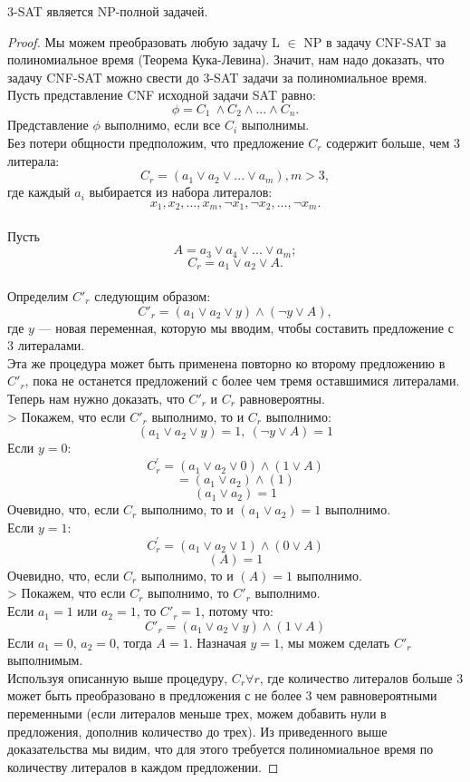     \begin{Thm}
        3-SAT является NP-полной задачей.
    \end{Thm}
    \begin{proof}
        Мы можем преобразовать любую задачу L $\in$ NP в задачу CNF-SAT за полиномиальное время (Теорема Кука-Левина). Значит, нам надо доказать, что задачу CNF-SAT можно свести до 3-SAT задачи за полиномиальное время.\\
        Пусть представление CNF исходной задачи SAT равно:
        $$\phi = C_1 \ \wedge C_2 \wedge ... \wedge C_n.$$ Представление $\phi$ выполнимо, если все $C_i$ выполнимы.\\
        Без потери общности предположим, что предложение $C_r$ содержит больше, чем 3 литерала:
        $$C_r = (a_1 \vee a_2 \vee ... \vee a_m), m>3,$$ где каждый $a_i$ выбирается из набора литералов:  $$x_1, x_2, ...,x_m, \neg x_1, \neg x_2, ..., \neg x_m.$$\\
        Пусть $$A = a_3 \vee a_4 \vee ... \vee a_m;$$
        $$C_r = a_1 \vee a_2 \vee A.$$\\
        Определим $C'_r$ следующим образом:
        $$C'_r = (a_1 \vee a_2 \vee y) \wedge (\neg y \vee A),$$ где $y$ --- новая переменная, которую мы вводим, чтобы составить предложение с 3 литералами.\\
        Эта же процедура может быть применена повторно ко второму предложению в $C'_r$, пока не останется предложений с более чем тремя оставшимися литералами.\\
        Теперь нам нужно доказать, что $C'_r$ и $C_r$ равновероятны.\\
        > Покажем, что если $C'_r$ выполнимо, то и $C_r$ выполнимо:
        $$(a_1 \vee a_2 \vee y)=1,\ (\neg y \vee A) = 1$$
        Если $y = 0$:
        $$C_r^\prime = (a_1 \vee a_2 \vee 0) \wedge (1 \vee A)$$
        $$ = (a_1 \vee a_2) \wedge (1) $$
        $$(a_1 \vee a_2) = 1$$
        Очевидно, что, если $C_r$ выполнимо, то и $(a_1 \vee a_2) = 1$ выполнимо.\\
        Если $y=1$:
        $$C_r^\prime = (a_1 \vee a_2 \vee 1) \wedge (0 \vee A)$$
        $$(A) = 1$$
        Очевидно, что, если $C_r$ выполнимо, то и $(A) = 1$ выполнимо.\\
        > Покажем, что если $C_r$ выполнимо, то $C'_r$ выполнимо.\\
        Если $a_1 = 1$ или $a_2 = 1$, то $C'_r = 1$, потому что:
        $$C'_r = (a_1 \vee a_2 \vee y) \wedge (1 \vee A) $$
        Если $a_1 = 0$, $a_2 = 0$, тогда $A = 1$. Назначая $y = 1$, мы можем сделать $C'_r$ выполнимым.\\
        Используя описанную выше процедуру, $C_r \forall r$, где количество литералов больше 3 может быть преобразовано в предложения с не более 3 чем равновероятными переменными (если литералов меньше трех, можем добавить нули в предложения, дополнив количество до трех). Из приведенного выше доказательства мы видим, что для этого требуется полиномиальное время по количеству литералов в каждом предложении.
    \end{proof}
